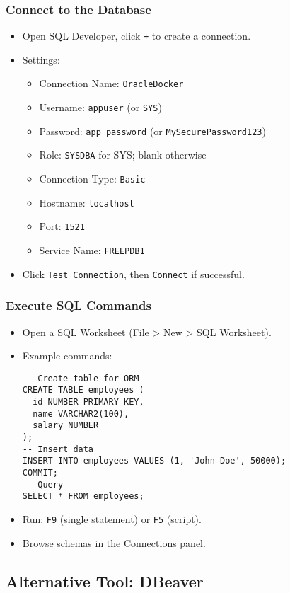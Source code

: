 \documentclass[a4paper,12pt]{article}
\begin{document}
\subsubsection{Connect to the Database}
\begin{itemize}
  \item Open SQL Developer, click \texttt{+} to create a connection.
  \item Settings:
    \begin{itemize}
      \item Connection Name: \texttt{OracleDocker}
      \item Username: \texttt{appuser} (or \texttt{SYS})
      \item Password: \texttt{app_password} (or \texttt{MySecurePassword123})
      \item Role: \texttt{SYSDBA} for SYS; blank otherwise
      \item Connection Type: \texttt{Basic}
      \item Hostname: \texttt{localhost}
      \item Port: \texttt{1521}
      \item Service Name: \texttt{FREEPDB1}
    \end{itemize}
  \item Click \texttt{Test Connection}, then \texttt{Connect} if successful.
\end{itemize}

\subsubsection{Execute SQL Commands}
\begin{itemize}
  \item Open a SQL Worksheet (File > New > SQL Worksheet).
  \item Example commands:
    \begin{lstlisting}
-- Create table for ORM
CREATE TABLE employees (
  id NUMBER PRIMARY KEY,
  name VARCHAR2(100),
  salary NUMBER
);
-- Insert data
INSERT INTO employees VALUES (1, 'John Doe', 50000);
COMMIT;
-- Query
SELECT * FROM employees;
    \end{lstlisting}
  \item Run: \texttt{F9} (single statement) or \texttt{F5} (script).
  \item Browse schemas in the Connections panel.
\end{itemize}

\subsection{Alternative Tool: DBeaver}
\end{document}
